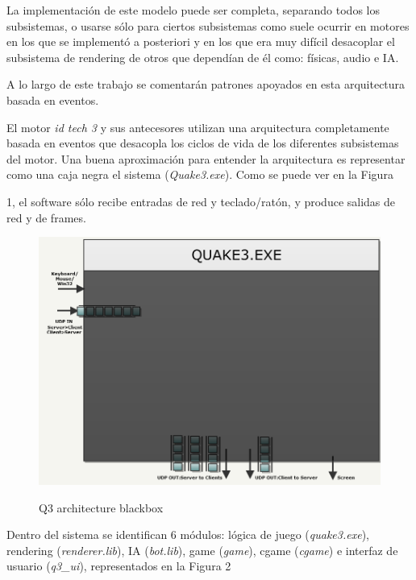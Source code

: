 \documentclass[a4paper,12pt]{report}
\begin{document}
\begin{itemize}
		La implementación de este modelo puede ser completa, separando todos los subsistemas, o usarse sólo para ciertos subsistemas como suele ocurrir en motores en los que se implementó a posteriori y en los que era muy difícil desacoplar el subsistema de rendering de otros que dependían de él como: físicas, audio e IA.
	
	    A lo largo de este trabajo se comentarán patrones apoyados en esta arquitectura basada en eventos.
		
	\end{itemize}	
	
	
	El motor \textit{id tech 3} y sus antecesores utilizan una arquitectura completamente basada en eventos que desacopla los ciclos de vida de los diferentes subsistemas del motor. Una buena aproximación para entender la arquitectura es representar como una caja negra el sistema (\textit{Quake3.exe}). Como se puede ver en la Figura  
	1, el software sólo recibe entradas de red y teclado/ratón, y produce salidas de red y de frames.
	
	
	\begin{center}
		\begin{figure}[h]
			\includegraphics[width=1\textwidth]{images/q3_architecture_blackbox}
			\label{fig:architectureblackbox}
			\caption{Q3 architecture blackbox}
		\end{figure}
	\end{center}

	Dentro del sistema se identifican 6 módulos: lógica de juego (\textit{quake3.exe}), rendering (\textit{renderer.lib}), IA (\textit{bot.lib}), game (\textit{game}), cgame (\textit{cgame}) e interfaz de usuario (\textit{q3\_ui}), representados en la Figura 2  
\end{document}
